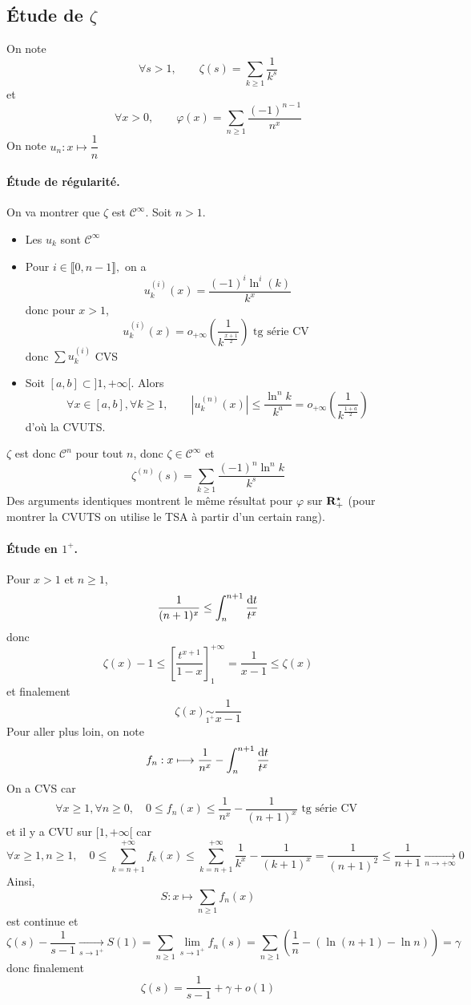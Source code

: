 \subsection{Étude de \texorpdfstring{$\zeta$}{zeta}}

On note \[
    \forall  s >1, \qquad  \zeta(s)=\sum_{k\geq 1} \frac{1}{k^s}
\] 
et \[
    \forall  x >0, \qquad  \varphi(x)=\sum_{n\geq 1}\frac{(-1)^{n-1}}{n^x}
\] 
On note $u_n: x \longmapsto \dfrac 1n$

\paragraph{Étude de régularité.} On va montrer que $\zeta$ est  $\mathcal  C^\infty$. Soit $n>1$.  \begin{itemize}
    \item Les $u_k$ sont  $\mathcal  C^\infty$
    \item Pour $i \in  \llbracket 0, n-1 \rrbracket ,$ on a \[
            u_k^{(i)}(x)=\frac{(-1)^i\ln^i(k)}{k^x}
    \] 
    donc pour $x>1$,  \[
        u_k^{(i)}(x)=o_{+\infty}\left( \frac{1}{k^{\frac{x+1}{2}}} \right) \text{ tg série CV }
    \] 
    donc $\sum u_k^{(i)}$ CVS
\item Soit $[a, b] \subset ]1, +\infty[$. Alors  \[
        \forall  x \in  [a, b], \forall  k \geq 1, \qquad  |u_k^{(n)}(x)|\leq \frac{\ln^nk}{k^a}=o_{+\infty}\left( \frac{1}{k^{\frac{1+a}2}} \right) 
\] 
d'où la CVUTS.
\end{itemize}
$\zeta$ est donc  $\mathcal  C^n$ pour tout $n$, donc  $\zeta \in \mathcal  C^\infty$ et \[
    \zeta^{(n)}(s)=\sum_{k\geq 1} \frac{(-1)^n\ln^nk}{k^s}
\] 
Des arguments identiques montrent le même résultat pour $\varphi$ sur $\mathbf R_+^\star$ (pour montrer la CVUTS on utilise le TSA à partir d'un certain rang). 

\paragraph{Étude en \boldmath $1^+$\unboldmath.}
Pour $x>1$ et  $n\geq 1$, \[
    \frac{1}{(n+1)^x}\leq \int_n^{n+1} \frac{\mathop{}\!\mathrm d t}{t^x}
\] 
donc \[
    \zeta(x)-1\leq \left[ \frac{t^{x+1}}{1-x} \right]_1^{+\infty}=\frac{1}{x-1}\leq \zeta(x)
\] 
et finalement \[
    \zeta(x)\underset{1^+}\sim \frac{1}{x-1}
\] 
Pour aller plus loin, on note \[
    f_n:x\longmapsto \frac{1}{n^x}-\int_n^{n+1}\frac{\mathop{}\!\mathrm d t}{t^x}
\] 
On a CVS car \[
    \forall  x \geq 1, \forall  n\geq 0, \quad  0\leq f_n(x)\leq \frac{1}{n^x}-\frac{1}{(n+1)^x}\text{ tg série CV }
\] 
et il y a CVU sur $[1, +\infty[$ car \[
    \forall  x\geq 1, n\geq 1, \quad 0\leq \sum_{k=n+1}^{+\infty}f_k(x)\leq \sum_{k=n+1}^{+\infty}\frac{1}{k^x}-\frac{1}{(k+1)^x}=\frac{1}{(n+1)^2}\leq \frac{1}{n+1} \xrightarrow[n\to+\infty]{}0
\] 
Ainsi, \[
    S:x \longmapsto \sum_{n\geq 1}f_n(x)
\] 
est continue et \[
    \zeta(s)-\frac{1}{s-1} \xrightarrow[s \to  1^+]{}S(1)=\sum_{n\geq 1}\lim _{s \to 1^+}f_n(s)=\sum_{n\geq 1}\left( \frac{1}{n}-(\ln(n+1)-\ln n) \right) =\gamma
\] 
donc finalement \[
    \zeta(s)=\frac{1}{s-1}+\gamma+o(1)
\] 

